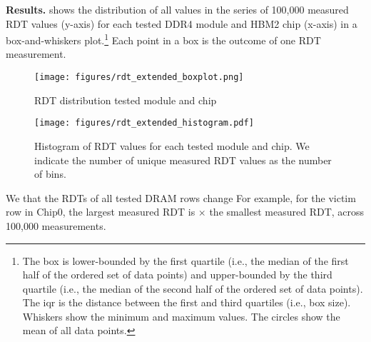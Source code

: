 \noindent
\textbf{Results.}  shows the distribution of
all values in the series of 100,000 measured RDT values (y-axis) for each tested
DDR4 module and HBM2 chip (x-axis) in a box-and-whiskers plot.\footnote{{{The
box is lower-bounded by the first quartile (i.e., the median of the first half
of the ordered set of data points) and upper-bounded by the third quartile
(i.e., the median of the second half of the ordered set of data points). The
\gls{iqr} is the distance between the first and third quartiles (i.e., box
size). Whiskers show the minimum and maximum values. The circles show the mean
of all data points.\label{footnote:box-whiskers}}}} Each point in a box is the
outcome of one RDT measurement.

\begin{figure}[!ht]
    \centering
    \texttt{[image: figures/rdt\_extended\_boxplot.png]}
    \caption{RDT distribution 
    tested module and chip}
    \label{fig:rdt_extended_boxplot}
\end{figure}


\begin{figure*}[!th]
    \centering
    \texttt{[image: figures/rdt\_extended\_histogram.pdf]}
    \vspace{-5mm}
    \caption{Histogram of RDT values for  each
    tested module and chip. We indicate the number of unique measured RDT values
    as the number of bins. }
    \label{fig:rdt_extended_histogram}
\end{figure*}



We  that the RDTs of all tested DRAM rows 
change  For example, for the victim row
in Chip0, the largest measured RDT is $\times{}$ the smallest
measured RDT, across 100,000 measurements.

